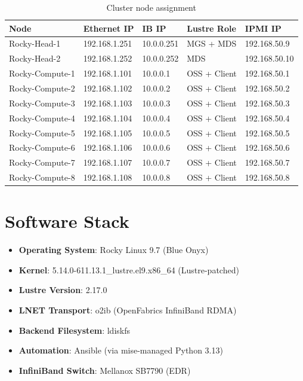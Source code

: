 \begin{table}[h]
\centering
\caption{Cluster node assignment}
\label{tab:nodes}
\begin{tabular}{lllll}
\hline
\textbf{Node} & \textbf{Ethernet IP} & \textbf{IB IP} & \textbf{Lustre Role} & \textbf{IPMI IP} \\
\hline
Rocky-Head-1 & 192.168.1.251 & 10.0.0.251 & MGS + MDS & 192.168.50.9 \\
Rocky-Head-2 & 192.168.1.252 & 10.0.0.252 & MDS & 192.168.50.10 \\
Rocky-Compute-1 & 192.168.1.101 & 10.0.0.1 & OSS + Client & 192.168.50.1 \\
Rocky-Compute-2 & 192.168.1.102 & 10.0.0.2 & OSS + Client & 192.168.50.2 \\
Rocky-Compute-3 & 192.168.1.103 & 10.0.0.3 & OSS + Client & 192.168.50.3 \\
Rocky-Compute-4 & 192.168.1.104 & 10.0.0.4 & OSS + Client & 192.168.50.4 \\
Rocky-Compute-5 & 192.168.1.105 & 10.0.0.5 & OSS + Client & 192.168.50.5 \\
Rocky-Compute-6 & 192.168.1.106 & 10.0.0.6 & OSS + Client & 192.168.50.6 \\
Rocky-Compute-7 & 192.168.1.107 & 10.0.0.7 & OSS + Client & 192.168.50.7 \\
Rocky-Compute-8 & 192.168.1.108 & 10.0.0.8 & OSS + Client & 192.168.50.8 \\
\hline
\end{tabular}
\end{table}

\section{Software Stack}

\begin{itemize}
    \item \textbf{Operating System}: Rocky Linux 9.7 (Blue Onyx)
    \item \textbf{Kernel}: 5.14.0-611.13.1\_lustre.el9.x86\_64 (Lustre-patched)
    \item \textbf{Lustre Version}: 2.17.0
    \item \textbf{LNET Transport}: o2ib (OpenFabrics InfiniBand RDMA)
    \item \textbf{Backend Filesystem}: ldiskfs
    \item \textbf{Automation}: Ansible (via mise-managed Python 3.13)
    \item \textbf{InfiniBand Switch}: Mellanox SB7790 (EDR)
\end{itemize}

